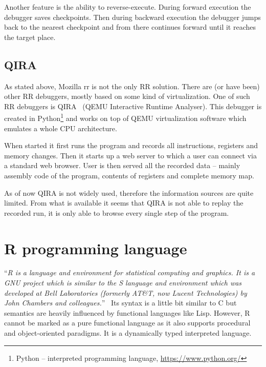 \documentclass[thesis=M,english,hidelinks]{FITthesis}[2012/10/20]
\newcommand*{\qt}[1]{\enquote{{\itshape#1}}}
\begin{document}
		Another feature is the ability to reverse-execute. During forward execution the debugger saves checkpoints. Then during backward execution the debugger jumps back to the nearest checkpoint and from there continues forward until it reaches the target place.\par

	\section{QIRA}
	As stated above, Mozilla rr is not the only RR solution. There are (or have been) other RR debuggers, mostly based on some kind of virtualization. One of such RR debuggers is QIRA~\cite{qira} (QEMU Interactive Runtime Analyser). This debugger is created in Python\footnote{Python -- interpreted programming language, \url{https://www.python.org/}} and works on top of QEMU virtualization software which emulates a whole CPU architecture.\par
	
	When started it first runs the program and records all instructions, registers and memory changes. Then it starts up a web server to which a user can connect via a standard web browser. User is then served all the recorded data -- mainly assembly code of the program, contents of registers and complete memory map.\par
	
	As of now QIRA is not widely used, therefore the information sources are quite limited. From what is available it seems that QIRA is not able to replay the recorded run, it is only able to browse every single step of the program.\par

\chapter{R programming language}
\qt{R is a language and environment for statistical computing and graphics. It is a GNU project which is similar to the S language and environment which was developed at Bell Laboratories (formerly AT\&T, now Lucent Technologies) by John Chambers and colleagues.}~\cite{about_r} Its syntax is a little bit similar to C but semantics are heavily influenced by functional languages like Lisp. However, R cannot be marked as a pure functional language as it also supports procedural and object-oriented paradigms. It is a dynamically typed interpreted language.\par
\end{document}
